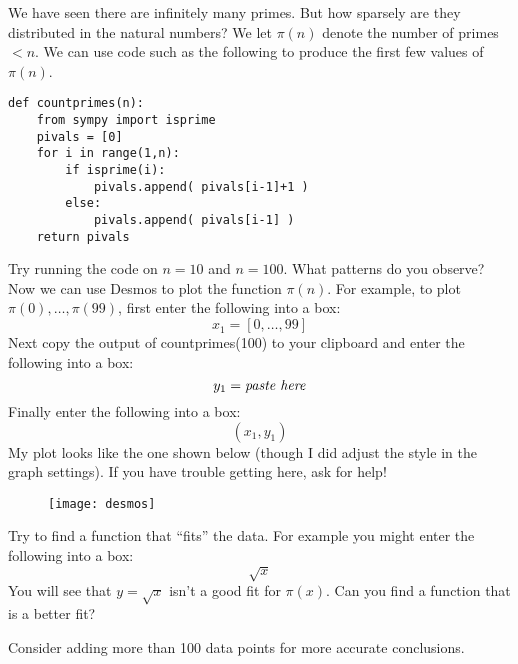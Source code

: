 \documentclass[12pt]{exam}
\begin{document}
\begin{questions}
  \question We have seen there are infinitely many primes. But how sparsely are they distributed in the natural numbers? We let $\pi(n)$ denote the number of primes $<n$. We can use code such as the following to produce the first few values of $\pi(n)$.
  
  \begin{lstlisting}
def countprimes(n):
    from sympy import isprime
    pivals = [0]
    for i in range(1,n):
        if isprime(i):
            pivals.append( pivals[i-1]+1 )
        else:
            pivals.append( pivals[i-1] )
    return pivals
  \end{lstlisting}
  
  Try running the code on $n=10$ and $n=100$. What patterns do you observe?
  \newpage
  \question Now we can use Desmos to plot the function $\pi(n)$. For example, to plot $\pi(0),\ldots,\pi(99)$, first enter the following into a box:
  \[x_1=[0,\ldots,99]
  \]
  Next copy the output of countprimes(100) to your clipboard and enter the following into a box:
  \[y_1=\emph{paste here}
  \]
  Finally enter the following into a box:
  \[(x_1,y_1)
  \]
  My plot looks like the one shown below (though I did adjust the style in the graph settings). If you have trouble getting here, ask for help!
  \begin{figure}[h]
    \centering
    \texttt{[image: desmos]}
  \end{figure}
  
  Try to find a function that ``fits'' the data. For example you might enter the following into a box:
  \[\sqrt{x}
  \]
  You will see that $y=\sqrt{x}$ isn't a good fit for $\pi(x)$. Can you find a function that is a better fit?
 
  Consider adding more than 100 data points for more accurate conclusions.
\end{questions}
\end{document}
